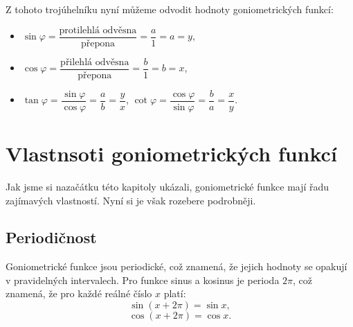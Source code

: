 \documentclass[12pt,a4paper]{article}
\begin{document}
\begin{center}
\end{center}

Z tohoto trojúhelníku nyní můžeme odvodit hodnoty goniometrických funkcí:
\begin{itemize}
    \item $\sin\varphi = \dfrac{\text{protilehlá odvěsna}}{\text{přepona}} = \dfrac{a}{1} = a = y$,
    \item $\cos\varphi = \dfrac{\text{přilehlá odvěsna}}{\text{přepona}} = \dfrac{b}{1} = b = x$,
    \item $\tan\varphi = \dfrac{\sin\varphi}{\cos\varphi} = \dfrac{a}{b} = \dfrac{y}{x}$, \qquad $\cot\varphi = \dfrac{\cos\varphi}{\sin\varphi} = \dfrac{b}{a} = \dfrac{x}{y}$.
\end{itemize}


\section{Vlastnsoti goniometrických funkcí}
Jak jsme si nazačátku této kapitoly ukázali, goniometrické funkce mají řadu zajímavých vlastností.
Nyní si je však rozebere podrobněji.

\subsection{Periodičnost}
Goniometrické funkce jsou periodické, což znamená, že jejich hodnoty se opakují v pravidelných intervalech.
Pro funkce sinus a kosinus je perioda $2\pi$, což znamená, že pro každé reálné číslo $x$ platí:
\[\sin(x + 2\pi) = \sin x,\]
\[\cos(x + 2\pi) = \cos x.\]
\end{document}
